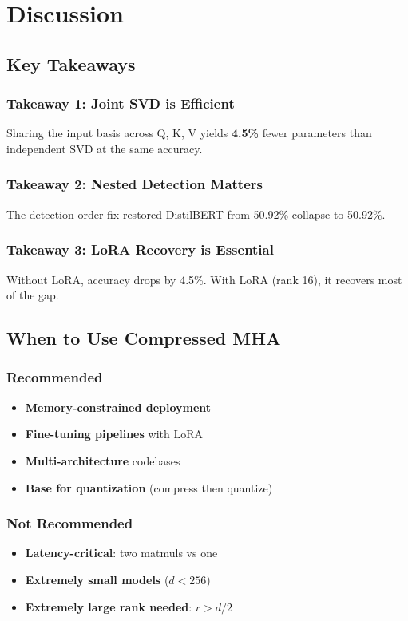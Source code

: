 \section{Discussion}

\subsection{Key Takeaways}

\subsubsection{Takeaway 1: Joint SVD is Efficient}

Sharing the input basis across Q, K, V yields \textbf{4.5\%} fewer 
parameters than independent SVD at the same accuracy.

\subsubsection{Takeaway 2: Nested Detection Matters}

The detection order fix restored DistilBERT from 50.92\% collapse to 
50.92\%.

\subsubsection{Takeaway 3: LoRA Recovery is Essential}

Without LoRA, accuracy drops by 4.5\%. With LoRA (rank 16), it 
recovers most of the gap.

\subsection{When to Use Compressed MHA}

\subsubsection{Recommended}
\begin{itemize}
\item \textbf{Memory-constrained deployment}
\item \textbf{Fine-tuning pipelines} with LoRA
\item \textbf{Multi-architecture} codebases
\item \textbf{Base for quantization} (compress then quantize)

\end{itemize}
\subsubsection{Not Recommended}
\begin{itemize}
\item \textbf{Latency-critical}: two matmuls vs one
\item \textbf{Extremely small models} ($d < 256$)
\item \textbf{Extremely large rank needed}: $r > d/2$

\end{itemize}
